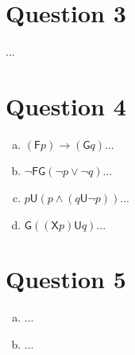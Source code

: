 \documentclass{article}
\newcommand{\X}{{\mathsf{X}}}
\newcommand{\F}{{\mathsf{F}}}
\newcommand{\G}{{\mathsf{G}}}
\newcommand{\U}{\mathrel{\mathsf{U}}}
\begin{document}
\section*{Question 3}

...

\section*{Question 4}

\begin{enumerate}[(a)]
  
\item $(\F p) \rightarrow (\G q)$...
  
\item $\neg \F \G(\neg p \lor \neg q)$...
  
\item $p \U (p \land (q \U \neg p))$...
  
\item $\G((\X p) \U q)$...

\end{enumerate}

\section*{Question 5}

\begin{enumerate}[(a)]
\item ...

\item ...
\end{enumerate}
\end{document}
